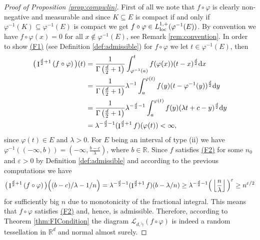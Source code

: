 \documentclass[11pt,a4paper]{article}
\theoremstyle{plain}
\theoremstyle{definition}
\theoremstyle{remark}
\def\RR{\mathbb{R}}
\def\cL{\mathcal{L}}
\newcommand{\dd}{{\rm d}}
\newcommand{\frI}{\mathop{\mathrm{I}}\nolimits}
\begin{document}
\begin{proof}[Proof of Proposition \ref{prop:compwlin}]    
    First of all we note that $f \circ \varphi$ is clearly non-negative and measurable and since $K\subseteq E$ is compact if and only if $\varphi^{-1}(K)\subseteq \varphi^{-1}(E)$ is compact we get $f \circ \varphi\in L_{\rm loc}^{1,+}(\varphi^{-1}(E))$. By convention we have $f\circ \varphi(x)=0$ for all $x\not \in \varphi^{-1}(E)$, see Remark \ref{rem:convention}. In order to show \hyperref[item:F1]{(F1)} (see Definition \ref{def:admissible}) for $f\circ \varphi$ we let $t\in \varphi^{-1}(E)$, then
    \begin{align*}
        \big(\frI^{\frac{d}{2}+1}\left(f\circ \varphi\right)\big)(t)&=\frac{1}{\Gamma\left(\frac{d}{2}+1\right)}\int_{\varphi^{-1}(a)}^{t}f(\varphi(x))(t-x)^{\frac{d}{2}}\dd x\\
        &=\frac{1}{\Gamma\left(\frac{d}{2}+1\right)}\lambda^{-1}\int_{a}^{\varphi(t)}f(y)(t-\varphi^{-1}(y))^{\frac{d}{2}}\dd y\\
        &=\frac{1}{\Gamma\left(\frac{d}{2}+1\right)}\lambda^{-\frac{d}{2}-1}\int_{a}^{\varphi(t)}f(y)(\lambda t+c-y)^{\frac{d}{2}}\dd y\\
        &=\lambda^{-\frac{d}{2}-1}(\frI^{\frac{d}{2}+1}f)(\varphi(t))<\infty,
    \end{align*}
    since $\varphi(t)\in E$ and $\lambda >0$. For $E$ being an interval of type (ii) we have $\varphi^{-1}((-\infty,b))=(-\infty, \frac{b-c}{\lambda})$, where $b\in \RR$. Since $f$ satisfies \hyperref[item:F2]{(F2)} for some $n_0$ and $\varepsilon>0$ by Definition \ref{def:admissible} and according to the previous computations we have
    \begin{align*}
        \big(\frI^{\frac{d}{2}+1}\left(f\circ \varphi\right)\big)\Big((b-c)/\lambda-1/n\Big)=\lambda^{-\frac{d}{2}-1}(\frI^{\frac{d}{2}+1}f)(b-\lambda/n) \ge \lambda^{-\frac{d}{2}-1}\Big(\left\lfloor {n\over \lambda}\right\rfloor\Big)^{\varepsilon}\ge n^{\varepsilon/2}
    \end{align*}
    for sufficiently big $n$ due to monotonicity of the fractional integral. This means that $f\circ \varphi$ satisfies \hyperref[item:F2]{(F2)} and, hence, is admissible. Therefore, according to Theorem \ref{thm:FICondition} the diagram $\cL_{d,\widetilde{\gamma}}(f\circ \varphi)$ is indeed a random tessellation in $\RR^d$ and normal almost surely. 
    

\end{proof}
\end{document}
